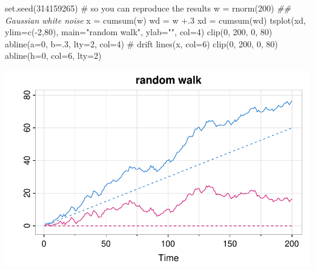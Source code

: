 \documentclass[
  letterpaper,
  DIV=11,
  numbers=noendperiod]{scrreprt}
\newenvironment{Shaded}{\begin{snugshade}}{\end{snugshade}}
\newcommand{\AttributeTok}[1]{\textcolor[rgb]{0.40,0.45,0.13}{#1}}
\newcommand{\CommentTok}[1]{\textcolor[rgb]{0.37,0.37,0.37}{#1}}
\newcommand{\DecValTok}[1]{\textcolor[rgb]{0.68,0.00,0.00}{#1}}
\newcommand{\DocumentationTok}[1]{\textcolor[rgb]{0.37,0.37,0.37}{\textit{#1}}}
\newcommand{\FunctionTok}[1]{\textcolor[rgb]{0.28,0.35,0.67}{#1}}
\newcommand{\NormalTok}[1]{\textcolor[rgb]{0.00,0.23,0.31}{#1}}
\newcommand{\OtherTok}[1]{\textcolor[rgb]{0.00,0.23,0.31}{#1}}
\newcommand{\SpecialCharTok}[1]{\textcolor[rgb]{0.37,0.37,0.37}{#1}}
\newcommand{\StringTok}[1]{\textcolor[rgb]{0.13,0.47,0.30}{#1}}
\begin{document}
\begin{Shaded}
\begin{Highlighting}[]
\FunctionTok{set.seed}\NormalTok{(}\DecValTok{314159265}\NormalTok{) }\CommentTok{\# so you can reproduce the results}
\NormalTok{w  }\OtherTok{=} \FunctionTok{rnorm}\NormalTok{(}\DecValTok{200}\NormalTok{)  }\DocumentationTok{\#\# Gaussian white noise}
\NormalTok{x  }\OtherTok{=} \FunctionTok{cumsum}\NormalTok{(w)}
\NormalTok{wd }\OtherTok{=}\NormalTok{ w }\SpecialCharTok{+}\NormalTok{.}\DecValTok{3} 
\NormalTok{xd }\OtherTok{=} \FunctionTok{cumsum}\NormalTok{(wd)}
\FunctionTok{tsplot}\NormalTok{(xd, }\AttributeTok{ylim=}\FunctionTok{c}\NormalTok{(}\SpecialCharTok{{-}}\DecValTok{2}\NormalTok{,}\DecValTok{80}\NormalTok{), }\AttributeTok{main=}\StringTok{"random walk"}\NormalTok{, }\AttributeTok{ylab=}\StringTok{""}\NormalTok{, }\AttributeTok{col=}\DecValTok{4}\NormalTok{)}
 \FunctionTok{clip}\NormalTok{(}\DecValTok{0}\NormalTok{, }\DecValTok{200}\NormalTok{, }\DecValTok{0}\NormalTok{, }\DecValTok{80}\NormalTok{)}
 \FunctionTok{abline}\NormalTok{(}\AttributeTok{a=}\DecValTok{0}\NormalTok{, }\AttributeTok{b=}\NormalTok{.}\DecValTok{3}\NormalTok{, }\AttributeTok{lty=}\DecValTok{2}\NormalTok{, }\AttributeTok{col=}\DecValTok{4}\NormalTok{) }\CommentTok{\# drift}
\FunctionTok{lines}\NormalTok{(x, }\AttributeTok{col=}\DecValTok{6}\NormalTok{)}
 \FunctionTok{clip}\NormalTok{(}\DecValTok{0}\NormalTok{, }\DecValTok{200}\NormalTok{, }\DecValTok{0}\NormalTok{, }\DecValTok{80}\NormalTok{)}
 \FunctionTok{abline}\NormalTok{(}\AttributeTok{h=}\DecValTok{0}\NormalTok{, }\AttributeTok{col=}\DecValTok{6}\NormalTok{, }\AttributeTok{lty=}\DecValTok{2}\NormalTok{)}
\end{Highlighting}
\end{Shaded}

\includegraphics{LectureNotes/Lecture1_files/figure-pdf/random-walk-with-drift-1.pdf}
\end{document}

